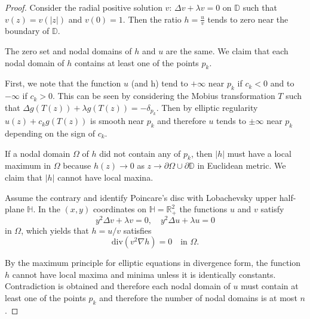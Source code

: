 \documentclass[10pt,a4paper]{amsart}
\begin{document}
\begin{proof}
Consider the radial positive solution $v$: $\Delta v+\lambda v=0$ on $\mathbb{D}$ such that $v(z)= v(|z|)$ and $v(0)=1$. Then the ratio $h=\frac{u}{v}$ tends to zero near the boundary of $\mathbb{D}$. 


 The zero set and nodal domains of $h$ and $u$ are the same.
We claim that each nodal domain of $h$ contains at least one of the points $p_k$.

 First, we note that the function $u$ (and h) tend to $+\infty$ near $p_k$ if $c_k<0$ and to $-\infty$ if $c_k>0$. This can be seen by considering the Mobius transformation $T$ such that $\Delta g(T(z))+\lambda g(T(z))= -\delta_{p_k}$. Then by elliptic regularity $u(z)+c_kg(T(z))$ is smooth near $p_k$ and therefore $u$ tends to $\pm\infty$ near $p_k$ depending on the sign of $c_k$.

If a nodal domain $\Omega$ of $h$ did not contain any of $p_k$, then 
 $|h|$ must have a local maximum in $\Omega$ because $h(z) \to 0$ as $z\to \partial \Omega \cup \partial \mathbb{D}$ in Euclidean metric. We claim that $|h|$ cannot have local maxina.

Assume the contrary and identify Poincare's disc with Lobachevsky upper half-plane $\mathbb{H}$.   In the $(x,y)$ coordinates on $\mathbb{H}=\mathbb{R}_{+}^{2}$ 
the functions $u$ and $v$ satisfy $$y^{2}\Delta v+\lambda v=0, \quad  y^{2}\Delta u+\lambda u=0$$
in $\Omega$, which yields that $h=u/v$ satisfies
\[
\text{div}(v^{2}\nabla h)=0 \quad \text{in } \Omega.
\]

By the maximum principle for elliptic equations in divergence form,
the function $h$ cannot have local maxima and minima unless it is identically constants. Contradiction is obtained and therefore each nodal domain of $u$ must contain at least one of the points $p_k$ and therefore the number of nodal domains is at most $n$.


\end{proof}
\end{document}
